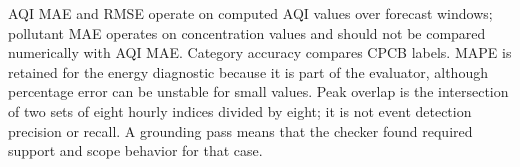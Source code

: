\documentclass[conference]{IEEEtran}
\begin{document}
AQI MAE and RMSE operate on computed AQI values over forecast windows; pollutant MAE operates on concentration values and should not be compared numerically with AQI MAE. Category accuracy compares CPCB labels. MAPE is retained for the energy diagnostic because it is part of the evaluator, although percentage error can be unstable for small values. Peak overlap is the intersection of two sets of eight hourly indices divided by eight; it is not event detection precision or recall. A grounding pass means that the checker found required support and scope behavior for that case.



\end{document}
